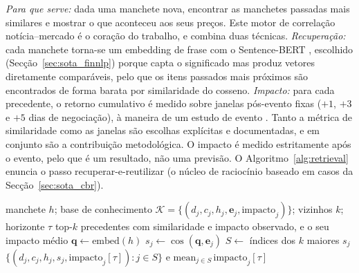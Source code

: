 \emph{Para que serve:} dada uma manchete nova, encontrar as manchetes passadas mais similares e mostrar o
que aconteceu aos seus preços. Este motor de correlação notícia--mercado é o coração do trabalho, e combina
duas técnicas. \emph{Recuperação:} cada manchete torna-se um embedding de frase com o Sentence-BERT
\autocite{reimers2019sbert}, escolhido (Secção~\ref{sec:sota_finnlp}) porque capta o significado mas produz
vetores diretamente comparáveis, pelo que os itens passados mais próximos são encontrados de forma barata
por similaridade do cosseno. \emph{Impacto:} para cada precedente, o retorno cumulativo é medido sobre
janelas pós-evento fixas ($+1$, $+3$ e $+5$ dias de negociação), à maneira de um estudo de evento
\autocite{fama1969adjustment, brown1985daily}. Tanto a métrica de similaridade como as janelas são escolhas
explícitas e documentadas, e em conjunto são a contribuição metodológica. O impacto é medido estritamente
após o evento, pelo que é um resultado, não uma previsão. O Algoritmo~\ref{alg:retrieval} enuncia o passo
recuperar-e-reutilizar (o núcleo de raciocínio baseado em casos da Secção~\ref{sec:sota_cbr}).

\begin{algorithm}[ht]
\caption{Recuperação de precedentes e reporte de impacto (gatilho de notícias).}
\label{alg:retrieval}
\begin{algorithmic}[1]
\Require manchete $h$; base de conhecimento $\mathcal{K}=\{(d_j,c_j,h_j,\mathbf{e}_j,\text{impacto}_j)\}$; vizinhos $k$; horizonte $\tau$
\Ensure top-$k$ precedentes com similaridade e impacto observado, e o seu impacto médio
\State $\mathbf{q} \gets \mathrm{embed}(h)$ 
  \State $s_j \gets \cos(\mathbf{q}, \mathbf{e}_j)$ 
\EndFor
\State $S \gets$ índices dos $k$ maiores $s_j$
\State \Return $\{(d_j,c_j,h_j,s_j,\text{impacto}_j[\tau]) : j \in S\}$ e $\mathrm{mean}_{j\in S}\,\text{impacto}_j[\tau]$
\end{algorithmic}
\end{algorithm}

